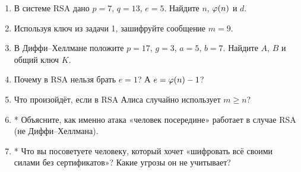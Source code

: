 \begin{tasksbox}
\begin{enumerate}
  \item В системе RSA дано $p = 7$, $q = 13$, $e = 5$. Найдите $n$, $\varphi(n)$ и $d$.
  \item Используя ключ из задачи 1, зашифруйте сообщение $m = 9$.
  \item В Диффи--Хеллмане положите $p = 17$, $g = 3$, $a = 5$, $b = 7$. Найдите $A$, $B$ и общий ключ $K$.
  \item Почему в RSA нельзя брать $e = 1$? А $e = \varphi(n) - 1$?
  \item Что произойдёт, если в RSA Алиса случайно использует $m \ge n$?
  \item* Объясните, как именно атака «человек посередине» работает в случае RSA (не Диффи--Хеллмана).
  \item* Что вы посоветуете человеку, который хочет «шифровать всё своими силами без сертификатов»? Какие угрозы он не учитывает?
\end{enumerate}
\end{tasksbox}
